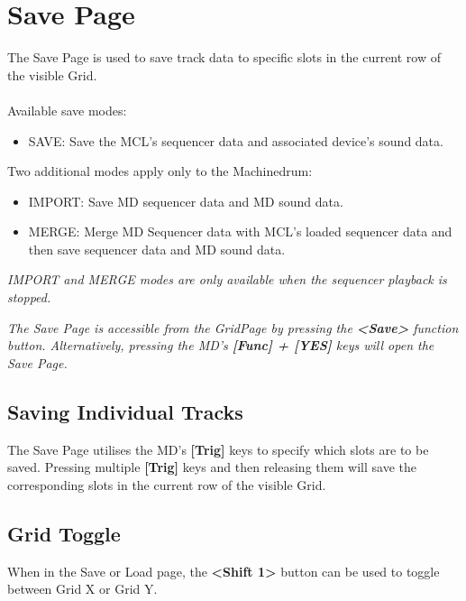 \chapter{Save Page}

The Save Page is used to save track data to specific slots in the current row of the visible  Grid.\\
\\
Available save modes:
\begin{itemize}
    \item SAVE: Save the MCL's sequencer data and associated device's sound data.
\end{itemize}
Two additional modes apply only to the Machinedrum:
\begin{itemize}
    \item IMPORT: Save MD sequencer data and MD sound data. 
    \item MERGE: Merge MD Sequencer data with MCL's loaded sequencer data and then save sequencer data and MD sound data.
\end{itemize}
\textit{IMPORT and MERGE modes are only available when the sequencer playback is stopped.}
\\



\textit{The Save Page is accessible from the GridPage by pressing the \textbf{<Save>} function button. Alternatively, pressing the MD's \textbf{[Func] + [YES]} keys will open the Save Page.}

\newpage
\section{Saving Individual Tracks}
The Save Page utilises the MD's \textbf{[Trig]} keys to specify which slots are to be saved. Pressing multiple \textbf{[Trig]} keys and then releasing them will save the corresponding slots in the current row of the visible Grid.
\section{Grid Toggle}
When in the Save or Load page, the \textbf{<Shift 1>} button can be used to toggle between Grid X or Grid Y.

